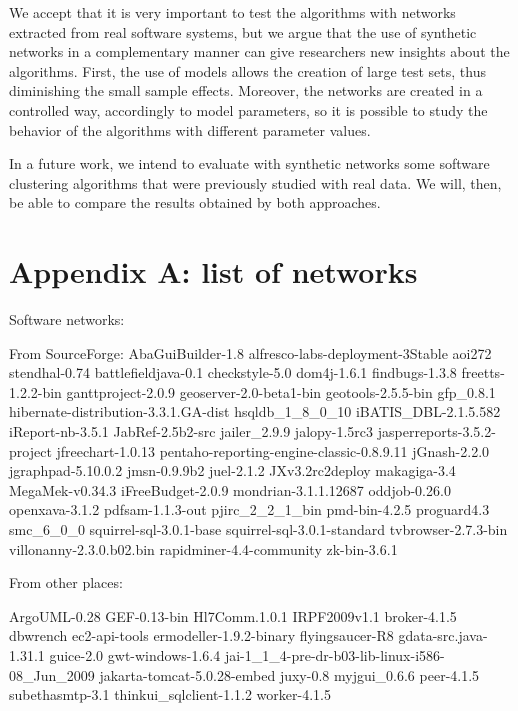 
We accept that it is very important to test the algorithms with networks
extracted from real software systems, but we argue that the use of synthetic
networks in a complementary manner can give researchers new insights about the
algorithms. First, the use of models allows the creation of large test sets,
thus diminishing the small sample effects. Moreover, the networks are created in
a controlled way, accordingly to model parameters, so it is possible to study
the behavior of the algorithms with different parameter values.

In a future work, we intend to evaluate with synthetic networks some software
clustering algorithms that were previously studied with real data. We will,
then, be able to compare the results obtained by both approaches.

\section{Appendix A: list of networks}

Software networks:

From SourceForge:
AbaGuiBuilder-1.8
alfresco-labs-deployment-3Stable
aoi272
stendhal-0.74
battlefieldjava-0.1
checkstyle-5.0
dom4j-1.6.1
findbugs-1.3.8
freetts-1.2.2-bin
ganttproject-2.0.9
geoserver-2.0-beta1-bin
geotools-2.5.5-bin
gfp\_0.8.1
hibernate-distribution-3.3.1.GA-dist
hsqldb\_1\_8\_0\_10
iBATIS\_DBL-2.1.5.582
iReport-nb-3.5.1
JabRef-2.5b2-src
jailer\_2.9.9
jalopy-1.5rc3
jasperreports-3.5.2-project
jfreechart-1.0.13
pentaho-reporting-engine-classic-0.8.9.11
jGnash-2.2.0
jgraphpad-5.10.0.2
jmsn-0.9.9b2
juel-2.1.2
JXv3.2rc2deploy
makagiga-3.4
MegaMek-v0.34.3
iFreeBudget-2.0.9
mondrian-3.1.1.12687
oddjob-0.26.0
openxava-3.1.2
pdfsam-1.1.3-out
pjirc\_2\_2\_1\_bin
pmd-bin-4.2.5
proguard4.3
smc\_6\_0\_0
squirrel-sql-3.0.1-base
squirrel-sql-3.0.1-standard
tvbrowser-2.7.3-bin
villonanny-2.3.0.b02.bin
rapidminer-4.4-community
zk-bin-3.6.1

From other places:

ArgoUML-0.28
GEF-0.13-bin
Hl7Comm.1.0.1
IRPF2009v1.1
broker-4.1.5
dbwrench
ec2-api-tools
ermodeller-1.9.2-binary
flyingsaucer-R8
gdata-src.java-1.31.1
guice-2.0
gwt-windows-1.6.4
jai-1\_1\_4-pre-dr-b03-lib-linux-i586-08\_Jun\_2009
jakarta-tomcat-5.0.28-embed
juxy-0.8
myjgui\_0.6.6
peer-4.1.5
subethasmtp-3.1
thinkui\_sqlclient-1.1.2
worker-4.1.5

